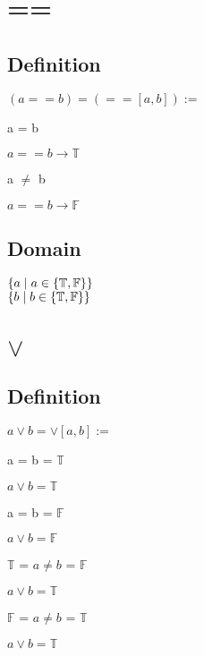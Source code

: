 \documentclass[11pt]{article}
\begin{document}
\section{==}
\subsection{Definition}
\begin{center}
$
(a == b) = (==[a,b]) :=
$
\end{center}
a = b
\begin{center}
$
a == b \rightarrow \mathbb{T}
$
\end{center}
\vspace{2mm}
a $\neq$ b
\begin{center}
$
a == b \rightarrow \mathbb{F}
$
\end{center}
\subsection{Domain}
\begin{center}
$
\{a \hspace{1mm} | \hspace{1mm} a \in \{\mathbb{T},\mathbb{F}\} \}
$
\\ \vspace{2mm}
$
\{b \hspace{1mm} | \hspace{1mm} b \in \{\mathbb{T},\mathbb{F}\} \}
$
\end{center}




\section{$\lor$}
\subsection{Definition}
\begin{center}
$
a \lor b = \lor[a,b] :=
$
\end{center}
\vspace{2mm}
a = b = $\mathbb{T}$
\begin{center}
$
a \lor b = \mathbb{T}
$
\end{center}
\vspace{2mm}
a = b = $\mathbb{F}$
\begin{center}
$
a \lor b  = \mathbb{F}
$
\end{center}
\vspace{2mm}
$\mathbb{T}$ = $a \neq b$ = $\mathbb{F}$
\begin{center}
$
a \lor b = \mathbb{T}
$
\end{center}
\vspace{2mm}
$\mathbb{F}$ = $a \neq b$ = $\mathbb{T}$
\begin{center}
$
a \lor b = \mathbb{T}
$
\end{center}
\end{document}

